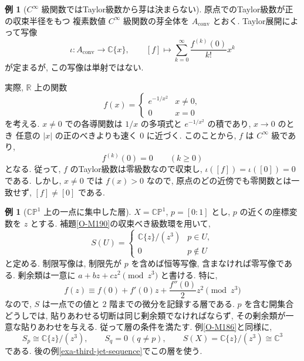 \documentclass[dvipdfmx,a4paper,11pt]{article} %
\newcommand{\R}{\mathbb{R}}
\newcommand{\C}{\mathbb{C}}
\theoremstyle{definition}
\numberwithin{equation}{section}
\newtheorem{exa}[thm]{例}
\begin{document}
\begin{exa}[$C^\infty$ 級関数ではTaylor級数から芽は決まらない]

原点でのTaylor級数が正の収束半径をもつ
複素数値 $C^\infty$ 級関数の芽全体を $A_{\mathrm{conv}}$ とおく.
Taylor展開によって写像
\[
\iota:A_{\mathrm{conv}}\longrightarrow\C\{x\},
\qquad
[f]\longmapsto
\sum_{k=0}^{\infty}\frac{f^{(k)}(0)}{k!}x^k
\]
が定まるが, この写像は単射ではない.

実際, $\R$ 上の関数
\[
f(x)=
\begin{cases}
e^{-1/x^2} & x\neq0,\\
0 & x=0
\end{cases}
\]
を考える.
$x\neq0$ での各導関数は $1/x$ の多項式と
$e^{-1/x^2}$ の積であり, $x\to0$ のとき
任意の $|x|$ の正のべきよりも速く $0$ に近づく.
このことから, $f$ は $C^\infty$ 級であり, 
\[
f^{(k)}(0)=0\qquad(k\geq0)
\]
となる.
従って, $f$ のTaylor級数は零級数なので収束し, 
$\iota([f])=\iota([0])=0$ である.
しかし, $x\neq0$ では $f(x)>0$ なので, 
原点のどの近傍でも零関数とは一致せず, $[f]\neq[0]$ である.
\end{exa}


\begin{exa}[$\C\mathbb P^1$ 上の一点に集中した層]\label{exa-skyscraper-jets3}
$X=\C\mathbb P^1$, $p=[0:1]$ とし, $p$ の近くの座標変数を $z$ とする.
補題\ref{O-M190}の収束べき級数環を用いて,
\[
S(U)=\begin{cases}\C\{z\}/(z^3)&p\in U,\\0&p\notin U\end{cases}
\]
と定める. 制限写像は, 制限先が $p$ を含めば恒等写像, 含まなければ零写像である.
剰余類は一意に $a+bz+cz^2\pmod{z^3}$ と書ける. 特に,
\[
f(z)\equiv f(0)+f'(0)z+\frac{f''(0)}{2}z^2\pmod{z^3}
\]
なので, $S$ は一点での値と $2$ 階までの微分を記録する層である.
$p$ を含む開集合どうしでは, 貼りあわせる切断は同じ剰余類でなければならず,
その剰余類が一意な貼りあわせを与える. 従って層の条件を満たす.
例\ref{O-M186}と同様に,
\[
S_p\cong\C\{z\}/(z^3),\qquad S_q=0\ (q\neq p),\qquad
S(X)=\C\{z\}/(z^3)\cong\C^3
\]
である. 後の例\ref{exa-third-jet-sequence}でこの層を使う.
\end{exa}
\end{document}
